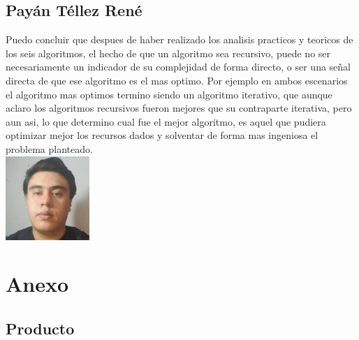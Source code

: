\documentclass[spanish]{article}
\begin{document}
			\subsection{Payán Téllez René}
			Puedo concluir que despues de haber realizado los analisis practicos y teoricos de los seis algoritmos, el hecho de que un algoritmo sea recursivo, puede no ser necesariamente un indicador de su complejidad de forma directo, o ser una señal directa de que ese algoritmo es el mas optimo. Por ejemplo en ambos escenarios el algoritmo mas optimos termino siendo un algoritmo iterativo, que aunque aclaro los algoritmos recursivos fueron mejores que su contraparte iterativa, pero aun asi, lo que determino cual fue el mejor algoritmo, es aquel que pudiera optimizar mejor los recursos dados y solventar de forma mas ingeniosa el problema planteado.\\
			\includegraphics[height=120px,width=120px]{Rene}
		\section{Anexo}
			\subsection{Producto}
\end{document}
